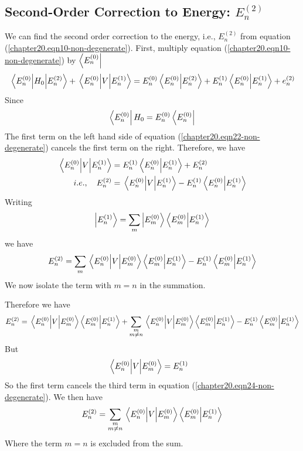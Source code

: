 	
	\subsection{Second-Order Correction to Energy: $E_n^{(2)}$}
	
	We can find the second order correction to the energy, i.e., $E^{(2)}_n$ from equation (\ref{chapter20.eqn10-non-degenerate}). First, multiply equation (\ref{chapter20.eqn10-non-degenerate}) by $\bra{E_n^{(0)}}$ 
	\begin{equation}
		\matrixel{E_n^{(0)}} {H_0} {E_n^{(2)}} + \matrixel{E_n^{(0)}} {V} {E_n^{(1)}} = E_n^{(0)} \braket{E_n^{(0)}}{E_n^{(2)}} + E_n^{(1)} \braket{E_n^{(0)}}{E_n^{(1)}} + e_n^{(2)}
		\label{chapter20.eqn22-non-degenerate}
	\end{equation}
	Since
	\begin{equation}
		\bra{E_n^{(0)}} H_0 = E_n^{(0)} \bra{E_n^{(0)}}
	\end{equation}
	The first term on the left hand side of equation (\ref{chapter20.eqn22-non-degenerate}) cancels the first term on the right. Therefore, we have
	\begin{align}
		\matrixel{E_n^{(0)}} {V} {E_n^{(1)}} 
		&=  E_n^{(1)} \braket{E_n^{(0)}}{E_n^{(1)}} + E_n^{(2)}\\
		i.e., \quad E_n^{(2)} &=  \matrixel{E_n^{(0)}} {V} {E_n^{(1)}}  - E_n^{(1)} \braket{E_n^{(0)}}{E_n^{(1)}}
		\label{chapter20.eqn23-non-degenerate}
	\end{align}
	Writing
	\begin{equation}
		\ket{E_n^{(1)}} = \sum_{m} \ket{E_m^{(0)}} \braket{E_m^{(0)}}{E_n^{(1)}}
	\end{equation}
	we have
	\begin{equation}
		E_n^{(2)} = \sum_{m} \matrixel{E_n^{(0)}} {V} {E_m^{(0)}} \braket{E_m^{(0)}}{E_n^{(1)}}  -  E_n^{(1)} \braket{E_m^{(0)}}{E_n^{(1)}}
	\end{equation}
	We now isolate the term with $m=n$ in the summation.
	
	Therefore we have
	\begin{equation}
		E_n^{(2)} = \matrixel{E_n^{(0)}} {V} {E_m^{(0)}} \braket{E_m^{(0)}}{E_n^{(1)}} + \sum_{\substack{m\\ m \neq n}} \matrixel{E_n^{(0)}} {V} {E_m^{(0)}} \braket{E_m^{(0)}}{E_n^{(1)}}  -  E_n^{(1)} \braket{E_m^{(0)}}{E_n^{(1)}}
		\label{chapter20.eqn24-non-degenerate}
	\end{equation}
	But
	\begin{align}
		\matrixel{E_n^{(0)}} {V} {E_m^{(0)}} &= E_n^{(1)}
	\end{align}
	So the first term cancels the third term in equation (\ref{chapter20.eqn24-non-degenerate}). We then have
	\begin{equation}
		E_n^{(2)} = \sum_{\substack{m\\ m \neq n}} \matrixel{E_n^{(0)}} {V} {E_m^{(0)}} \braket{E_m^{(0)}}{E_n^{(1)}}
		\label{chapter20.eqn25-non-degenerate}
	\end{equation}
	Where the 
	term $m=n$ is excluded from the sum.

